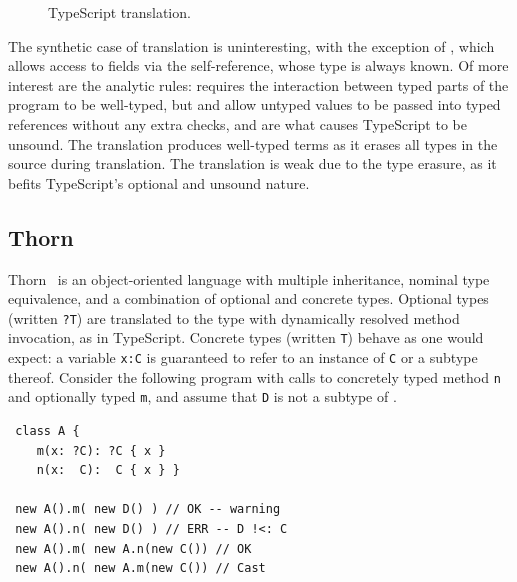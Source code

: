 \documentclass[acmlarge, anonymous, authordraft]{acmart}
\newcommand{\code}[1]{{\tt #1}\xspace}
\begin{document}
\begin{figure}[!h]
\begin{minipage}{\textwidth}
\begin{mathpar}


\end{mathpar}
\end{minipage}
\caption{TypeScript translation.}
\label{fig:tstrans_exp2}
\end{figure}

The synthetic case of translation is uninteresting, with the exception of
, which allows access to fields via the self-reference, whose
type is always known.  Of more interest are the analytic rules:
 requires the interaction between typed parts of the program
to be well-typed, but  and  allow untyped values
to be passed into typed references without any extra checks, and are what
causes TypeScript to be unsound.  The translation produces well-typed terms
as it erases all types in the source during translation. The translation is
weak due to the type erasure, as it befits TypeScript's optional and unsound
nature. 





\subsection{Thorn}

Thorn~\cite{oopsla09} is an object-oriented language with multiple inheritance,
nominal type equivalence, and a combination of optional and concrete types.
Optional types (written \code{?T}) are translated to the \any type with
dynamically resolved method invocation, as in TypeScript. Concrete types
(written \code{T}) behave as one would expect: a variable \code{x:C} is
guaranteed to refer to an instance of \code C or a subtype thereof. Consider the
following program with calls to concretely typed method \code n and optionally
typed \code m, and assume that \code D is not a subtype of \C.

\begin{lstlisting}
 class A {
    m(x: ?C): ?C { x }
    n(x:  C):  C { x } }

 new A().m( new D() ) // OK -- warning
 new A().n( new D() ) // ERR -- D !<: C
 new A().m( new A.n(new C()) // OK
 new A().n( new A.m(new C()) // Cast
\end{lstlisting}
\end{document}
